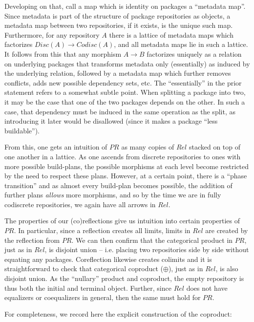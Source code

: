\documentclass[hoptionsi,review,screen,format=sigconf]{acmart}
\theoremstyle{definition}
\newcommand{\PRb}{\mathit{PR}}
\newcommand{\Relb}{\mathit{Rel}}
\begin{document}
Developing on that, call a map which is identity on packages a ``metadata map''. Since metadata is part of the structure of package repositories as objects, a metadata map between two repositories, if it exists, is the unique such map. Furthermore, for any repository \(A\) there is a lattice of metadata maps which factorizes \(Disc(A) \to Codisc(A)\), and all metadata maps lie in such a lattice. It follows from this that any morphism \(A \to B\) factorizes uniquely as a relation on underlying packages that transforms metadata only (essentially) as induced by the underlying relation, followed by a metadata map which further removes conflicts, adds new possible dependency sets, etc. The ``essentially'' in the prior statement refers to a somewhat subtle point. When splitting a package into two, it may be the case that one of the two packages depends on the other. In such a case, that dependency must be induced in the same operation as the split, as introducing it later would be disallowed (since it makes a package ``less buildable'').

From this, one gets an intuition of \(\PRb\) as many copies of \(\Relb\) stacked on top of one another in a lattice. As one ascends from discrete repositories to ones with more possible build-plans, the possible morphisms at each level become restricted by the need to respect these plans. However, at a certain point, there is a ``phase transition'' and as almost every build-plan becomes possible, the addition of further plans \textit{allows} more morphisms, and so by the time we are in fully codiscrete repositories, we again have all arrows in \(\Relb\).

The properties of our (co)reflections give us intuition into certain properties of \(\PRb\). In particular, since a reflection creates all limits, limits in \(\Relb\) are created by the reflection from \(\PRb\). We can then confirm that the categorical product in \(\PRb\), just as in \(\Relb\), is disjoint union -- i.e. placing two repositories side by side without equating any packages. Coreflection likewise creates colimits and it is straightforward to check that categorical coproduct (\(\oplus\)), just as in \(\Relb\), is also disjoint union. As the ``nullary'' product and coproduct, the empty repository is thus both the initial and terminal object. Further, since \(\Relb\) does not have equalizers or coequalizers in general, then the same must hold for \(\PRb\).

For completeness, we record here the explicit construction of the coproduct:
\end{document}
